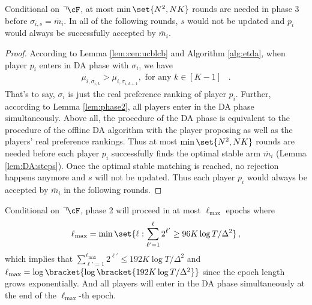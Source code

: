 \begin{lemma}\label{lem:phase3}
Conditional on $ \urcorner \cF$, 
at most $\min\set{N^2, NK}$ rounds are needed in phase 3 before $\sigma_{i,s} = \overline{m}_i$. In all of the following rounds, $s$ would not be updated and $p_i$ would always be successfully accepted by $\overline{m}_i$.
\end{lemma}

\begin{proof}
According to Lemma \ref{lem:cen:ucblcb} and Algorithm \ref{alg:etda}, when player $p_i$ enters in DA phase with $\sigma_i$, we have 
\begin{align*}
    \mu_{i,\sigma_{i,k}} > \mu_{i,\sigma_{i,k+1}}, \text{ for any $k\in[K-1]$ }\,.
\end{align*}
That's to say, $\sigma_i$ is just the real preference ranking of player $p_i$. 
Further, according to Lemma \ref{lem:phase2}, all players enter in the DA phase simultaneously. 
Above all, the procedure of the DA phase is equivalent to the procedure of the offline DA algorithm with the player proposing \citep{roth1984stability} as well as the players' real preference rankings. 
Thus at most $\min\set{N^2, NK}$ rounds are needed before each player $p_i$ successfully finds the optimal stable arm $\overline{m}_i$ (Lemma \ref{lem:DA:steps}). 
Once the optimal stable matching is reached, no rejection happens anymore and $s$ will not be updated. Thus each player $p_i$ would always be accepted by $\overline{m}_{i}$ in the following rounds. 
\end{proof}


\begin{lemma}\label{lem:phase2}
Conditional on $\urcorner \cF$, phase 2 will proceed in at most $\ell_{\max}$ epochs where 
\begin{align}
    \ell_{\max} = \min\set{\ell: \sum_{\ell'=1}^{\ell} 2^{\ell'} \ge 96K\log T/\Delta^2}\,, \label{eq:def:ellmax}
\end{align}
which implies that $\sum_{\ell'=1}^{\ell_{\max}} 2^{\ell'} \le 192K\log T/\Delta^2$ and $\ell_{\max} = \log \bracket{\log \bracket{192K\log T/\Delta^2} }$  since the epoch length grows exponentially. 
And all players will enter in the DA phase simultaneously at the end of the $\ell_{\max}$-th epoch. 
\end{lemma}

